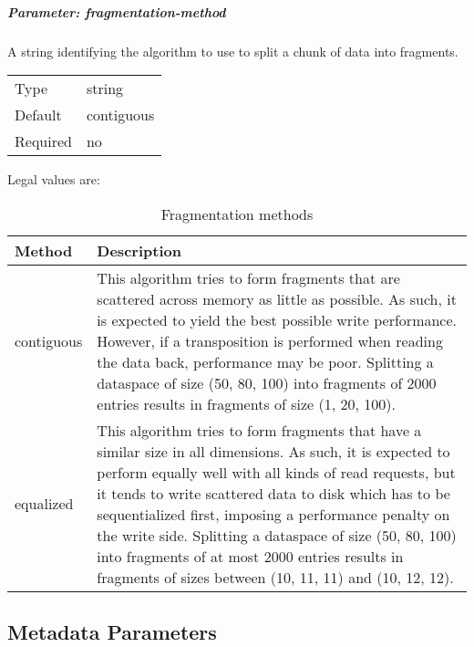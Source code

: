 \subparagraph{Parameter: fragmentation-method}
A string identifying the algorithm to use to split a chunk of data into fragments. 

\begin{preserve}
  \noindent
  \begin{tabular}{ll}
    Type     & string     \\ 
    Default  & contiguous \\ 
    Required & no         \\ 
  \end{tabular}
\end{preserve}

Legal values are:

\begin{preserve}
\begin{table}[!ht]
  \begin{center}
    \begin{tabularx}{\textwidth}{lX}
      Method     & Description \\
      \hline
      contiguous  & This algorithm tries to form fragments that are scattered across memory as little as possible. As such, it is expected to yield the best possible write performance. 
      However, if a transposition is performed when reading the data back, performance may be poor.
      Splitting a dataspace of size (50, 80, 100) into fragments of 2000 entries results in fragments of size (1, 20, 100). \\
      equalized   & This algorithm tries to form fragments that have a similar size in all dimensions. As such, it is expected to perform equally well with all kinds of read requests, but it tends to write scattered data to disk which has to be sequentialized first, imposing a performance penalty on the write side.
      Splitting a dataspace of size (50, 80, 100) into fragments of at most 2000 entries results in fragments of sizes between (10, 11, 11) and (10, 12, 12). \\
    \end{tabularx}
  \end{center}
  \caption{Fragmentation methods}%
  \label{tab:frag_methods}
\end{table}
\end{preserve}
\FloatBarrier
\vspace{\gapsize}


\subsection{Metadata Parameters}%
\label{sec:conf-file:metadata}

